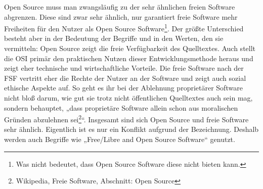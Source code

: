 \documentclass[a4paper,12pt]{article}
\begin{document}
Open Source muss man zwangsläufig zu der sehr ähnlichen freien Software abgrenzen. Diese sind zwar sehr ähnlich, nur garantiert freie Software mehr Freiheiten für den Nutzer als Open Source Software\footnote{Was nicht bedeutet, dass Open Source Software diese nicht bieten kann.}. Der größte Unterschied besteht aber in der Bedeutung der Begriffe und in den Werten, den sie vermitteln: Open Source zeigt die freie Verfügbarkeit des Quelltextes. Auch stellt die OSI primär den praktischen Nutzen dieser Entwicklungsmethode heraus und zeigt eher technische und wirtschaftliche Vorteile. Die freie Software nach der FSF vertritt eher die Rechte der Nutzer an der Software und zeigt auch sozial ethische Aspekte auf. So geht es ihr bei der Ablehnung proprietärer Software nicht bloß darum, wie gut sie trotz nicht öffentlichen Quelltextes auch sein mag, sondern behauptet, „dass proprietäre Software allein schon aus moralischen Gründen abzulehnen sei\footnote{Wikipedia, Freie Software, Abschnitt: Open Source}“. Insgesamt sind sich Open Source und freie Software sehr ähnlich. Eigentlich ist es nur ein Konflikt aufgrund der Bezeichnung. Deshalb werden auch Begriffe wie „Free/Libre and Open Source Software“ genutzt.
\end{document}

